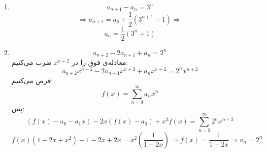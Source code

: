 \p
\begin{enumerate}
\item
$$a_{n+1} - a_n = 3^n$$
$$\Rightarrow a_{n+1} = a_0 + \frac{1}{2}(3^{n+1} - 1) \Rightarrow$$
$$a_n = \frac{1}{2}(3^n + 1)$$
\item
$$a_{n+2} - 2a_{n+1} + a_n = 2^n$$
معادله‌ی فوق را در
$x^{n+2}$
ضرب می‌کنیم:
$$a_{n+2}x^{n+2} - 2a_{n+1}x^{n+2} + a_nx^{n+2} = 2^nx^{n+2}$$
فرض می‌کنیم:
$$f(x) = \sum_{n=0}^{\infty}a_nx^n$$
پس:
$$(f(x) - a_0 - a_1x) - 2x(f(x) - a_0) + x^2f(x) = \sum_{n=0}^{\infty}2^nx^{n+2}$$
$$f(x)(1-2x+x^2)-1-2x+2x = x^2(\frac{1}{1-2x})\Rightarrow f(x) = \frac{1}{1-2x} \Rightarrow a_n = 2^n$$
\end{enumerate}